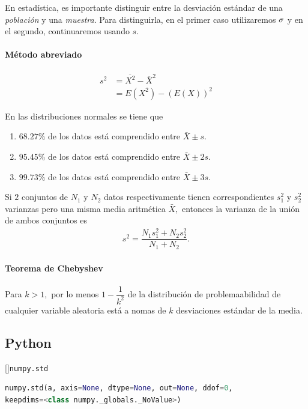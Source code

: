  \begin{rem}
  En estadística, es importante distinguir entre la desviación estándar de una \emph{población} y una \emph{muestra}. Para distinguirla, en el primer caso utilizaremos $\sigma$ y en el segundo, continuaremos usando $s.$
 \end{rem}


\paragraph{Método abreviado}
 \begin{align}
  s^{2}&=\overline{X^{2}}-\overline{X}^{2} \\
  &= E(X^2)-\left( E(X) \right)^{2}
 \end{align}



En las distribuciones normales se tiene que
\begin{enumerate}
 \item $68.27\%$ de los datos está comprendido entre $\bar{X}\pm s.$
 \item $95.45\%$ de los datos está comprendido entre $\bar{X}\pm 2s.$
 \item $99.73\%$ de los datos está comprendido entre $\bar{X}\pm 3s.$

\end{enumerate}



 Si $2$ conjuntos de $N_{1}$ y $N_{2}$ datos respectivamente tienen correspondientes $s_{1}^{2}$ y $s_{2}^{2}$ varianzas pero una misma media aritmética $\bar{X},$ entonces la varianza de la unión de ambos conjuntos es
 \begin{align}
s^{2}=\dfrac{N_{1}s_{1}^{2}+N_{2}s_{2}^{2}}{N_{1}+N_{2}}.
\end{align}

\paragraph{Teorema de Chebyshev}
Para $k>1,$ por lo menos $1-\dfrac{1}{k^{2}}$ de la distribución de problemaabilidad de cualquier variable aleatoria está a nomas  de $k$ desviaciones estándar de la media.

\subsection{Python}
[]{\texttt{numpy.std}}
\begin{lstlisting}[language=Python]
numpy.std(a, axis=None, dtype=None, out=None, ddof=0,
keepdims=<class numpy._globals._NoValue>)
\end{lstlisting}

